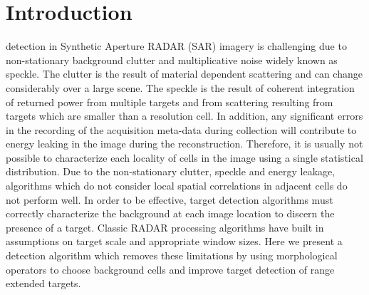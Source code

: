 \documentclass[journal]{IEEEtran}
\begin{document}
\section{Introduction}
 detection in Synthetic Aperture RADAR (SAR) imagery is challenging due to non-stationary background clutter and multiplicative noise widely known as speckle. The clutter is the result of material dependent scattering and can change considerably over a large scene. The speckle is the result of coherent integration of returned power from multiple targets and from scattering resulting from targets which are smaller than a resolution cell. In addition, any significant errors in the recording of the acquisition meta-data during collection will contribute to energy leaking in the image during the reconstruction. Therefore, it is usually not possible to characterize each locality of cells in the image using a single statistical distribution. Due to the non-stationary clutter, speckle and energy leakage, algorithms which do not consider local spatial correlations in adjacent cells do not perform well. In order to be effective, target detection algorithms must correctly characterize the background at each image location to discern the presence of a target. Classic RADAR processing algorithms have built in assumptions on target scale and appropriate window sizes. Here we present a detection algorithm which removes these limitations by using morphological operators to choose background cells and improve target detection of range extended targets.
\end{document}
